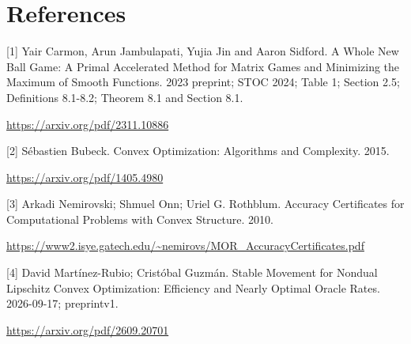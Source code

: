 \documentclass[10pt,a4paper]{article}
\begin{document}
\section{References}
[1] Yair Carmon, Arun Jambulapati, Yujia Jin and Aaron Sidford. A Whole New Ball Game: A Primal Accelerated Method for Matrix Games and Minimizing the Maximum of Smooth Functions. 2023 preprint; STOC 2024; Table 1; Section 2.5; Definitions 8.1-8.2; Theorem 8.1 and Section 8.1.

\url{https://arxiv.org/pdf/2311.10886}

[2] Sébastien Bubeck. Convex Optimization: Algorithms and Complexity. 2015.

\url{https://arxiv.org/pdf/1405.4980}

[3] Arkadi Nemirovski; Shmuel Onn; Uriel G. Rothblum. Accuracy Certificates for Computational Problems with Convex Structure. 2010.

\url{https://www2.isye.gatech.edu/~nemirovs/MOR_AccuracyCertificates.pdf}

[4] David Martínez-Rubio; Cristóbal Guzmán. Stable Movement for Nondual Lipschitz Convex Optimization: Efficiency and Nearly Optimal Oracle Rates. 2026-09-17; preprintv1.

\url{https://arxiv.org/pdf/2609.20701}
\end{document}
